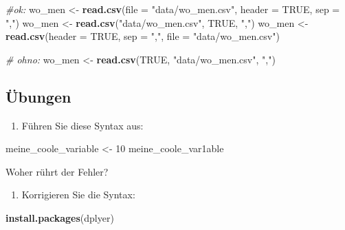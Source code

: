 \documentclass[12pt,ngerman,]{book}
\newenvironment{Shaded}{\begin{snugshade}}{\end{snugshade}}
\newcommand{\KeywordTok}[1]{\textcolor[rgb]{0.13,0.29,0.53}{\textbf{{#1}}}}
\newcommand{\DataTypeTok}[1]{\textcolor[rgb]{0.13,0.29,0.53}{{#1}}}
\newcommand{\DecValTok}[1]{\textcolor[rgb]{0.00,0.00,0.81}{{#1}}}
\newcommand{\StringTok}[1]{\textcolor[rgb]{0.31,0.60,0.02}{{#1}}}
\newcommand{\CommentTok}[1]{\textcolor[rgb]{0.56,0.35,0.01}{\textit{{#1}}}}
\newcommand{\OtherTok}[1]{\textcolor[rgb]{0.56,0.35,0.01}{{#1}}}
\newcommand{\NormalTok}[1]{{#1}}
\providecommand{\tightlist}{%
  \setlength{\itemsep}{0pt}\setlength{\parskip}{0pt}}
\renewenvironment{Shaded}{\begin{kframe}}{\end{kframe}}
\begin{document}
\begin{Shaded}
\begin{Highlighting}[]
\CommentTok{#ok:}
\NormalTok{wo_men <-}\StringTok{ }\KeywordTok{read.csv}\NormalTok{(}\DataTypeTok{file =} \StringTok{"data/wo_men.csv"}\NormalTok{, }\DataTypeTok{header =} \OtherTok{TRUE}\NormalTok{, }\DataTypeTok{sep =} \StringTok{","}\NormalTok{)}
\NormalTok{wo_men <-}\StringTok{ }\KeywordTok{read.csv}\NormalTok{(}\StringTok{"data/wo_men.csv"}\NormalTok{, }\OtherTok{TRUE}\NormalTok{, }\StringTok{","}\NormalTok{)}
\NormalTok{wo_men <-}\StringTok{ }\KeywordTok{read.csv}\NormalTok{(}\DataTypeTok{header =} \OtherTok{TRUE}\NormalTok{, }\DataTypeTok{sep =} \StringTok{","}\NormalTok{, }\DataTypeTok{file =} \StringTok{"data/wo_men.csv"}\NormalTok{)}


\CommentTok{# ohno:}
\NormalTok{wo_men <-}\StringTok{ }\KeywordTok{read.csv}\NormalTok{(}\OtherTok{TRUE}\NormalTok{, }\StringTok{"data/wo_men.csv"}\NormalTok{, }\StringTok{","}\NormalTok{)}
\end{Highlighting}
\end{Shaded}

\subsection{Übungen}\label{ubungen-1}

\begin{enumerate}
\def\labelenumi{\arabic{enumi}.}
\setcounter{enumi}{2}
\tightlist
\item
  Führen Sie diese Syntax aus:
\end{enumerate}

\begin{Shaded}
\begin{Highlighting}[]
\NormalTok{meine_coole_variable <-}\StringTok{ }\DecValTok{10}
\NormalTok{meine_coole_var1able }
\end{Highlighting}
\end{Shaded}

Woher rührt der Fehler?

\begin{enumerate}
\def\labelenumi{\arabic{enumi}.}
\setcounter{enumi}{3}
\tightlist
\item
  Korrigieren Sie die Syntax:
\end{enumerate}

\begin{Shaded}
\begin{Highlighting}[]
\KeywordTok{install.packages}\NormalTok{(dplyer)}
\end{Highlighting}
\end{Shaded}
\end{document}
